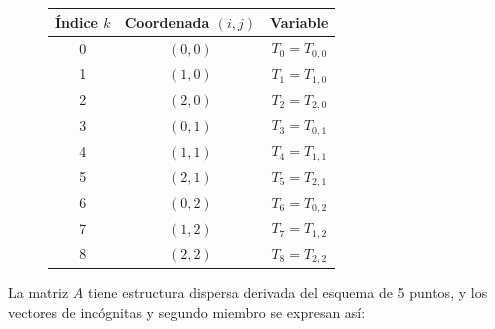 \documentclass{article}
\begin{document}
\begin{figure}[H]
\centering
\begin{minipage}[c]{0.45\textwidth}
\centering
\begin{tabular}{|c|c|c|}
\hline
Índice $k$ & Coordenada $(i,j)$ & Variable \\
\hline
0 & $(0,0)$ & $T_0 = T_{0,0}$ \\
1 & $(1,0)$ & $T_1 = T_{1,0}$ \\
2 & $(2,0)$ & $T_2 = T_{2,0}$ \\
3 & $(0,1)$ & $T_3 = T_{0,1}$ \\
4 & $(1,1)$ & $T_4 = T_{1,1}$ \\
5 & $(2,1)$ & $T_5 = T_{2,1}$ \\
6 & $(0,2)$ & $T_6 = T_{0,2}$ \\
7 & $(1,2)$ & $T_7 = T_{1,2}$ \\
8 & $(2,2)$ & $T_8 = T_{2,2}$ \\
\hline
\end{tabular}
\end{minipage}
\hspace{0.5cm} %
\begin{minipage}[c]{0.5\textwidth}
\centering
{}
\vspace{0.2mm}
\end{minipage}
\end{figure}

La matriz $A$ tiene estructura dispersa derivada del esquema de 5 puntos, y los vectores de incógnitas y segundo miembro se expresan así:
\end{document}
